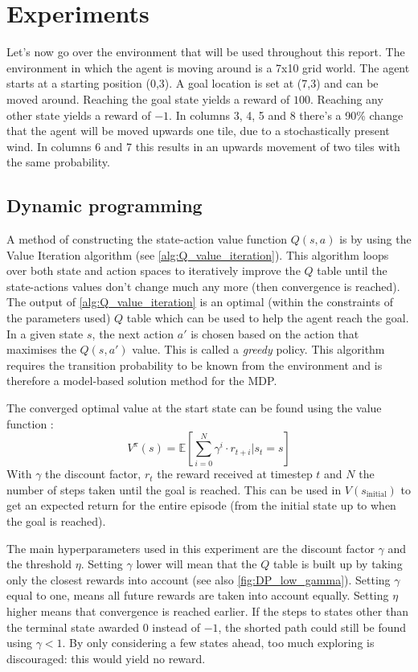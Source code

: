 \documentclass{article}
\theoremstyle{plain}
\theoremstyle{definition}
\theoremstyle{remark}
\begin{document}
\section{Experiments}\label{sec:experiments} %
Let's now go over the environment that will be used throughout this report. The environment in which the agent is moving around is a 7x10 grid world. The agent starts at a starting position (0,3). A goal location is set at (7,3) and can be moved around. Reaching the goal state yields a reward of $100$. Reaching any other state yields a reward of $-1$. In columns 3, 4, 5 and 8 there's a 90\% change that the agent will be moved upwards one tile, due to a stochastically present wind. In columns 6 and 7 this results in an upwards movement of two tiles with the same probability.

\subsection{Dynamic programming}\label{subsec:dynamic_programming}
A method of constructing the state-action value function $Q(s,a)$ is by using the Value Iteration algorithm (see \autoref{alg:Q_value_iteration}). This algorithm loops over both state and action spaces to iteratively improve the $Q$ table until the state-actions values don't change much any more (then convergence is reached). 
The output of \autoref{alg:Q_value_iteration} is an optimal (within the constraints of the parameters used) $Q$ table which can be used to help the agent reach the goal. In a given state $s$, the next action $a'$ is chosen based on the action that maximises the $Q(s,a')$ value. This is called a \textit{greedy} policy. This algorithm requires the transition probability to be known from the environment and is therefore a model-based solution method for the MDP. 


The converged optimal value at the start state can be found using the value function \cite{RL_book}:
\begin{equation}
    V^\pi(s) = \mathds{E}\left[\sum_{i=0}^N \gamma^i \cdot r_{t+i}|s_t = s \right]
    \label{eq:value_function}
\end{equation}
With $\gamma$ the discount factor, $r_t$ the reward received at timestep $t$ and $N$ the number of steps taken until the goal is reached. This can be used in $V(s_\text{initial})$ to get an expected return for the entire episode (from the initial state up to when the goal is reached).

The main hyperparameters used in this experiment are the discount factor $\gamma$ and the threshold $\eta$. Setting $\gamma$ lower will mean that the $Q$ table is built up by taking only the closest rewards into account (see also \autoref{fig:DP_low_gamma}). Setting $\gamma$ equal to one, means all future rewards are taken into account equally. Setting $\eta$ higher means that convergence is reached earlier. If the steps to states other than the terminal state awarded $0$ instead of $-1$, the shorted path could still be found using $\gamma<1$. By only considering a few states ahead, too much exploring is discouraged: this would yield no reward.
\end{document}
